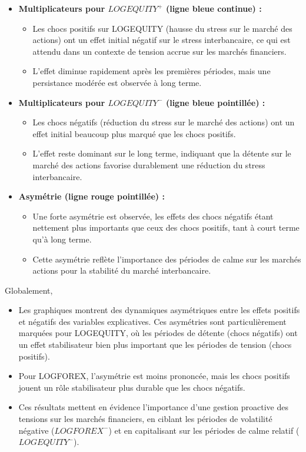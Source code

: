 \begin{itemize}
    \item \textbf{Multiplicateurs pour $LOGEQUITY^+$ (ligne bleue continue) :}
    \begin{itemize}
        \item Les chocs positifs sur LOGEQUITY (hausse du stress sur le marché des actions) ont un effet initial négatif sur le stress interbancaire, ce qui est attendu dans un contexte de tension accrue sur les marchés financiers.
        \item L’effet diminue rapidement après les premières périodes, mais une persistance modérée est observée à long terme.
    \end{itemize}

    \item \textbf{Multiplicateurs pour $LOGEQUITY^-$ (ligne bleue pointillée) :}
    \begin{itemize}
        \item Les chocs négatifs (réduction du stress sur le marché des actions) ont un effet initial beaucoup plus marqué que les chocs positifs.
        \item L’effet reste dominant sur le long terme, indiquant que la détente sur le marché des actions favorise durablement une réduction du stress interbancaire.
    \end{itemize}

    \item \textbf{Asymétrie (ligne rouge pointillée) :}
    \begin{itemize}
        \item Une forte asymétrie est observée, les effets des chocs négatifs étant nettement plus importants que ceux des chocs positifs, tant à court terme qu’à long terme.
        \item Cette asymétrie reflète l'importance des périodes de calme sur les marchés actions pour la stabilité du marché interbancaire.
    \end{itemize}
\end{itemize}

Globalement, 

\begin{itemize}
    \item Les graphiques montrent des dynamiques asymétriques entre les effets positifs et négatifs des variables explicatives. Ces asymétries sont particulièrement marquées pour LOGEQUITY, où les périodes de détente (chocs négatifs) ont un effet stabilisateur bien plus important que les périodes de tension (chocs positifs).
    \item Pour LOGFOREX, l’asymétrie est moins prononcée, mais les chocs positifs jouent un rôle stabilisateur plus durable que les chocs négatifs.
    \item Ces résultats mettent en évidence l'importance d’une gestion proactive des tensions sur les marchés financiers, en ciblant les périodes de volatilité négative (\(LOGFOREX^-\)) et en capitalisant sur les périodes de calme relatif (\(LOGEQUITY^-\)).
\end{itemize}

